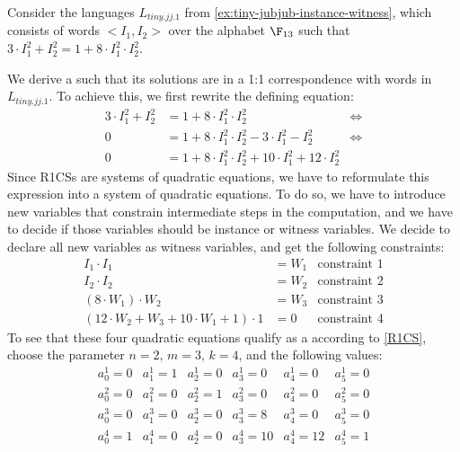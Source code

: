 \begin{example}
\label{ex:TJJ-r1cs}
 Consider the languages $L_{tiny.jj.1}$ from \examplename{} \ref{ex:tiny-jubjub-instance-witness}, which consists of words $<I_1,I_2>$ over the alphabet $\F_{13}$ such that $3\cdot I_1^2 + I_2^2 = 1 + 8\cdot I_1^2\cdot I_2^2$. 

We derive a  such that its solutions are in a 1:1 correspondence with words in $L_{tiny.jj.1}$.  To achieve this, we first rewrite the defining equation:
\begin{align*}
3\cdot I_1^2 + I_2^2  & = 1 + 8\cdot I_1^2\cdot I_2^2 & \Leftrightarrow \\
 0 & = 1 + 8\cdot I_1^2\cdot I_2^2 - 3\cdot I_1^2 - I_2^2  & \Leftrightarrow \\
 0 & = 1 + 8\cdot I_1^2\cdot I_2^2 + 10\cdot I_1^2 +12\cdot I_2^2
\end{align*}
Since R1CSs are systems of quadratic equations, we have to reformulate this expression into a system of quadratic equations. To do so, we have to introduce new variables that constrain intermediate steps in the computation, and we have to decide if those variables should be instance or witness variables. We decide to declare all new variables as witness variables, and get the following constraints:
\begin{align*}
I_1 \cdot I_1 & = W_1 & \text{constraint } 1\\
I_2 \cdot I_2 & = W_2 & \text{constraint } 2\\
(8 \cdot W_1) \cdot W_2 & = W_3 & \text{constraint } 3\\
(12\cdot W_2 + W_3 + 10\cdot W_1 + 1)\cdot 1 & = 0 & \text{constraint } 4
\end{align*}
To see that these four quadratic equations qualify as a  according to  \ref{R1CS}, choose the parameter $n=2$, $m=3$,  $k=4$, and the following values:
$$
\begin{array}{llllll}
a_0^1 = 0 & a_1^1= 1 & a_2^1= 0 & a_3^1 = 0 & a_4^1= 0  & a_5^1= 0 \\ 
a_0^2 = 0 & a_1^2= 0 & a_2^2= 1 & a_3^2 = 0 & a_4^2= 0  & a_5^2= 0 \\ 
a_0^3 = 0 & a_1^3= 0 & a_2^3= 0 & a_3^3 = 8 & a_4^3= 0  & a_5^3= 0 \\ 
a_0^4 = 1 & a_1^4= 0 & a_2^4= 0 & a_3^4 = 10 & a_4^4= 12  & a_5^4= 1 \\ 
\\

\end{array}$$
\end{example}
